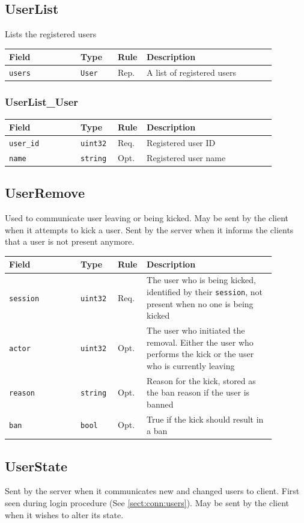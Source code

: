\documentclass[11pt]{article} %
\newenvironment{mumbleMessageEx}
{%
	\small
	\renewcommand\arraystretch{1.5}
	\begin{tabular}{p{0.25\linewidth}p{0.13\linewidth}p{0.05\linewidth}p{0.45\linewidth}}
	Field & Type & Rule & Description \\
	\hline
}
{%
	\end{tabular}
	\renewcommand\arraystretch{1.0}
}
\newcommand{\mumbleMessageExItem}[4]{ \texttt{#1} & \texttt{#2} & #3 & #4 \\ }
\begin{document}
\subsection{UserList}
\label{msg:userList}

Lists the registered users

\begin{mumbleMessageEx}
\mumbleMessageExItem{users}{User}{Rep.}{A list of registered users}
\end{mumbleMessageEx}

\subsubsection{UserList\_User}
\label{msg:userList:user}

\begin{mumbleMessageEx}
\mumbleMessageExItem{user\_id}{uint32}{Req.}{Registered user ID}
\mumbleMessageExItem{name}{string}{Opt.}{Registered user name}
\end{mumbleMessageEx}

\subsection{UserRemove}
\label{msg:userRemove}

Used to communicate user leaving or being kicked. May be sent by the client when it attempts to kick a user. Sent by the server when it informs the clients that a user is not present anymore.

\begin{mumbleMessageEx}
\mumbleMessageExItem{session}{uint32}{Req.}{The user who is being kicked, identified by their \texttt{session}, not present when no one is being kicked}
\mumbleMessageExItem{actor}{uint32}{Opt.}{The user who initiated the removal. Either the user who performs the kick or the user who is currently leaving}
\mumbleMessageExItem{reason}{string}{Opt.}{Reason for the kick, stored as the ban reason if the user is banned}
\mumbleMessageExItem{ban}{bool}{Opt.}{True if the kick should result in a ban}
\end{mumbleMessageEx}

\subsection{UserState}
\label{msg:userState}

Sent by the server when it communicates new and changed users to client. First seen during login procedure (See \ref{sect:conn:users}). May be sent by the client when it wishes to alter its state.
\end{document}
